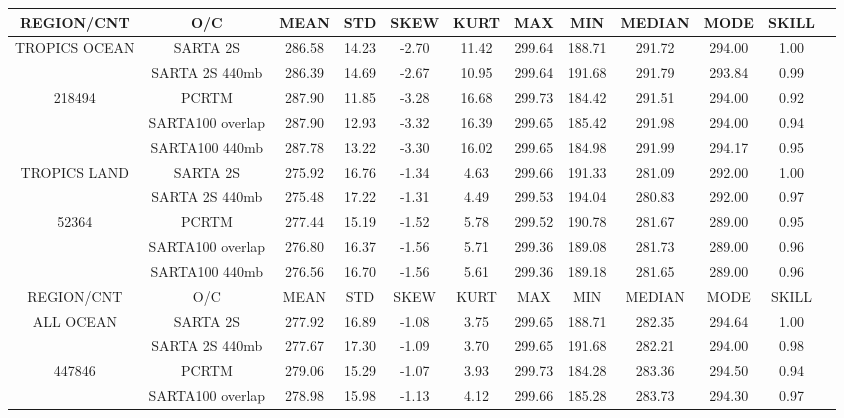 \documentclass[agupp]{aguplus}              %
\begin{document}
\begin{article}
\begin{center}
\begin{table}[ht]
{\small
\hfill{}
\begin{tabular}{cccccccccccc} %
\hline\hline %
  REGION/CNT    & O/C & MEAN  & STD & SKEW & KURT & MAX & MIN & MEDIAN & MODE & SKILL \\
\hline
TROPICS  OCEAN   & SARTA 2S & 286.58 & 14.23  & -2.70 & 11.42 & 299.64 & 188.71 & 291.72 & 294.00 &  1.00 \\
              & SARTA 2S 440mb & 286.39 & 14.69  & -2.67 & 10.95 & 299.64 & 191.68 & 291.79 & 293.84 &  0.99\\ 
   218494        & PCRTM & 287.90 & 11.85  & -3.28 & 16.68 & 299.73 & 184.42 & 291.51 & 294.00 &  0.92 \\
              & SARTA100 overlap & 287.90 & 12.93  & -3.32 & 16.39 & 299.65 & 185.42 & 291.98 & 294.00 &  0.94\\ 
              & SARTA100 440mb & 287.78 & 13.22  & -3.30 & 16.02 & 299.65 & 184.98 & 291.99 & 294.17 &  0.95 \\
\hline
 TROPICS LAND   & SARTA 2S & 275.92 & 16.76  & -1.34 &  4.63 & 299.66 & 191.33 & 281.09 & 292.00 &  1.00 \\
              & SARTA 2S 440mb & 275.48 & 17.22  & -1.31 &  4.49 & 299.53 & 194.04 & 280.83 & 292.00 &  0.97\\ 
   52364        & PCRTM & 277.44 & 15.19  & -1.52 &  5.78 & 299.52 & 190.78 & 281.67 & 289.00 &  0.95 \\
              & SARTA100 overlap & 276.80 & 16.37  & -1.56 &  5.71 & 299.36 & 189.08 & 281.73 & 289.00 &  0.96 \\
              & SARTA100 440mb & 276.56 & 16.70  & -1.56 &  5.61 & 299.36 & 189.18 & 281.65 & 289.00 &  0.96 \\
\hline \hline
  REGION/CNT    & O/C & MEAN  & STD & SKEW & KURT & MAX & MIN & MEDIAN & MODE & SKILL \\
\hline
ALL  OCEAN   & SARTA 2S & 277.92 & 16.89  & -1.08 &  3.75 & 299.65 & 188.71 & 282.35 & 294.64 &  1.00 \\
              & SARTA 2S 440mb & 277.67 & 17.30  & -1.09 &  3.70 & 299.65 & 191.68 & 282.21 & 294.00 &  0.98\\ 
   447846        & PCRTM & 279.06 & 15.29  & -1.07 &  3.93 & 299.73 & 184.28 & 283.36 & 294.50 &  0.94 \\
              & SARTA100 overlap & 278.98 & 15.98  & -1.13 &  4.12 & 299.66 & 185.28 & 283.73 & 294.30 &  0.97\\ 

\end{tabular}}
\end{table}
\end{center}
\end{article}
\end{document}
